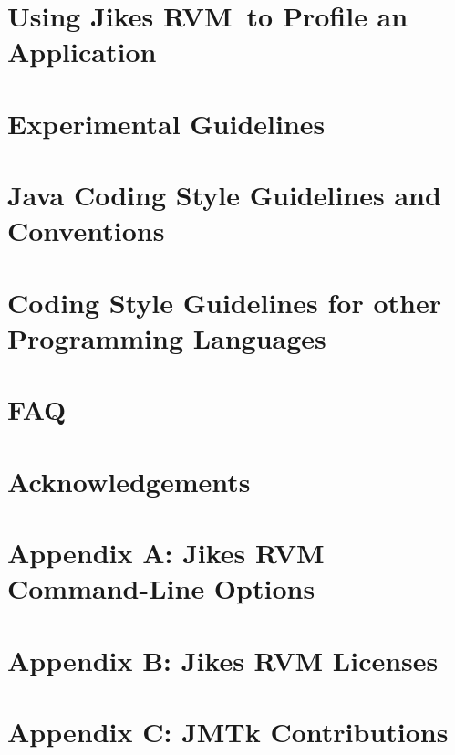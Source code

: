 \documentclass{article}
\newcommand{\jrvm}{Jikes RVM}
\begin{document}
\T \newpage
{}
\section{Using \jrvm\ to Profile an Application}


\T \newpage
{}
\section{Experimental Guidelines}


\T \newpage
{}
\section{Java Coding Style Guidelines and Conventions}
\label{section:javacodingstyle}


\T \newpage
{}
\section{Coding Style Guidelines for other Programming Languages}
\label{section:codingstyle-nonjava}


\T \newpage
{}
\section{FAQ}


\T \newpage
\section*{Acknowledgements}


\T \newpage
\T 
\T 

\T \newpage

\T \appendix

\section{Appendix A: Jikes RVM Command-Line Options}
\label{appendix:nonadaptive:cmdline}


\T \newpage
{}
\section{Appendix B: Jikes RVM Licenses}
\label{appendix:licenses}


\T \newpage
{}
\section{Appendix C: JMTk Contributions}
\label{appendix:contributions}


\W \section*{\indexname}\label{hlxindex}
\W \htmlprintindex
\T \printindex

 \W {}
 \W 
\end{document}
